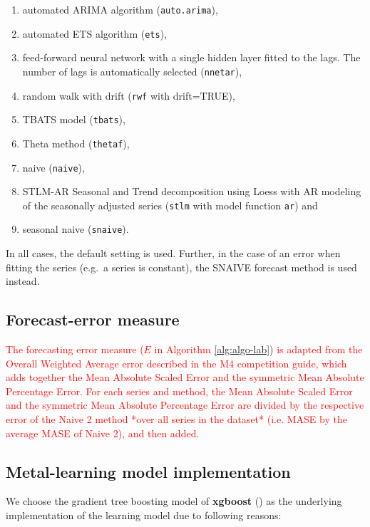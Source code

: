 \documentclass[11pt,a4paper,]{article}
\theoremstyle{definition}
\theoremstyle{definition}
\theoremstyle{definition}
\theoremstyle{remark}
\begin{document}
\begin{enumerate}
\def\labelenumi{\roman{enumi})}
\item
  automated ARIMA algorithm (\texttt{auto.arima}),
\item
  automated ETS algorithm (\texttt{ets}),
\item
  feed-forward neural network with a single hidden layer fitted to the
  lags. The number of lags is automatically selected (\texttt{nnetar}),
\item
  random walk with drift (\texttt{rwf} with drift=TRUE),
\item
  TBATS model (\texttt{tbats}),
\item
  Theta method (\texttt{thetaf}),
\item
  naive (\texttt{naive}),
\item
  STLM-AR Seasonal and Trend decomposition using Loess with AR modeling
  of the seasonally adjusted series (\texttt{stlm} with model function
  \texttt{ar}) and
\item
  seasonal naive (\texttt{snaive}).
\end{enumerate}

In all cases, the default setting is used. Further, in the case of an
error when fitting the series (e.g.~a series is constant), the SNAIVE
forecast method is used instead.

\subsection{Forecast-error measure}\label{forecast-error-measure}

\textcolor{red}{
The forecasting error measure ($E$ in Algorithm }\ref{alg:algo-lab})\textcolor{red}{ is adapted from the Overall Weighted Average error described in the M4 competition guide, which adds together the Mean Absolute Scaled Error and the symmetric Mean Absolute Percentage Error. For each series and method, the Mean Absolute Scaled Error and the symmetric Mean Absolute Percentage Error are divided by the respective error of the Naive 2 method *over all series in the dataset* (i.e. MASE by the average MASE of Naive 2), and then added.
}

\subsection{Metal-learning model
implementation}\label{metal-learning-model-implementation}

We choose the gradient tree boosting model of \textbf{xgboost}
(\textcite{chen2016xgboost}) as the underlying implementation of the
learning model due to following reasons:
\end{document}
